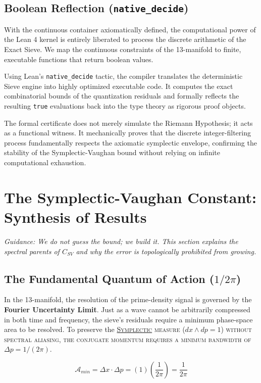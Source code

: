 \documentclass[sn-mathphys-num, pdflatex, referee]{sn-jnl}
\newcommand{\gterm}[2]{\begingroup\normalfont\scshape\hyperlink{#1}{#2}\endgroup}
\begin{document}
\subsection{Boolean Reflection (\texttt{native\_decide})}
\label{BF}
With the continuous container axiomatically defined, the computational power of the Lean 4 kernel is entirely liberated to process the discrete arithmetic of the Exact Sieve. We map the continuous constraints of the 13-manifold to finite, executable functions that return boolean values. 

Using Lean's \texttt{native\_decide} tactic, the compiler translates the deterministic Sieve engine into highly optimized executable code. It computes the exact combinatorial bounds of the quantization residuals and formally reflects the resulting \texttt{true} evaluations back into the type theory as rigorous proof objects. 

The formal certificate does not merely simulate the Riemann Hypothesis; it acts as a functional witness. It mechanically proves that the discrete integer-filtering process fundamentally respects the axiomatic symplectic envelope, confirming the stability of the Symplectic-Vaughan bound without relying on infinite computational exhaustion.
\section{The Symplectic-Vaughan Constant: Synthesis of Results}
\label{sec:constant}

\textit{Guidance: We do not guess the bound; we build it. This section explains the spectral parents of $C_{SV}$ and why the error is topologically prohibited from growing.}

\subsection{The Fundamental Quantum of Action (\texorpdfstring{$1/2\pi$}{1/2pi})}
In the 13-manifold, the resolution of the prime-density signal is governed by the \textbf{Fourier Uncertainty Limit}. Just as a wave cannot be arbitrarily compressed in both time and frequency, the sieve’s residuals require a minimum phase-space area to be resolved. To preserve the \gterm{geometry}{Symplectic} measure ($dx \wedge dp = 1$) without spectral aliasing, the conjugate momentum requires a minimum bandwidth of $\Delta p = 1/(2\pi)$. 

\begin{equation}
\label{A_min}
\mathcal{A}_{min} = \Delta x \cdot \Delta p = (1)\left(\frac{1}{2\pi}\right) = \frac{1}{2\pi}
\end{equation}
\end{document}
